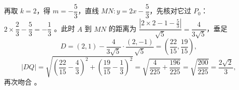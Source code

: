 \begin{answer}
再取 $k=2$，得 $m=-\dfrac53$，直线 $MN:y=2x-\dfrac53$，先核对它过 $P_0$：$2\times\dfrac23-\dfrac53=-\dfrac13$ 。此时 $A$ 到 $MN$ 的距离为 $\dfrac{|2\times2-1-\frac53|}{\sqrt5}=\dfrac{4}{3\sqrt5}$，垂足
\nopagebreak[4]
\[D=\left(2,1\right)-\frac{4}{3\sqrt5}\cdot\frac{(2,-1)}{\sqrt5}=\left(\frac{22}{15},\frac{19}{15}\right),\]
\nopagebreak[4]
\[|DQ|=\sqrt{\left(\frac{22}{15}-\frac43\right)^2+\left(\frac{19}{15}-\frac13\right)^2}=\sqrt{\frac{4}{225}+\frac{196}{225}}=\sqrt{\frac{200}{225}}=\frac{2\sqrt2}3,\]
再次吻合 。



\end{answer}